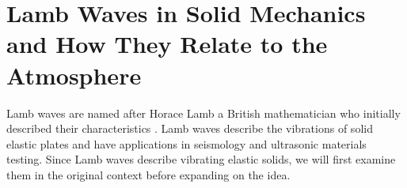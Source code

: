 \documentclass[twoside]{bsu-ms}
\begin{document}
\section{Lamb Waves in Solid Mechanics and How They Relate to the Atmosphere}\label{sec:1.1}
Lamb waves are named after Horace Lamb a British mathematician who initially described their characteristics \cite{Lamb}. Lamb waves describe the vibrations of solid elastic plates and have applications in seismology and ultrasonic materials testing. Since Lamb waves describe vibrating elastic solids, we will first examine them in the original context before expanding on the idea.
\end{document}
